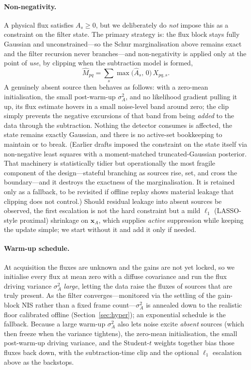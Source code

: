 \documentclass[11pt]{article}
\begin{document}
\paragraph{Non-negativity.} A physical flux satisfies $A_s\ge0$, but we deliberately do \emph{not}
impose this as a constraint on the filter state. The primary strategy is: the flux block stays
fully Gaussian and unconstrained---so the Schur marginalisation above remains exact and the filter
recursion never branches---and non-negativity is applied only at the point of \emph{use}, by
clipping when the subtraction model is formed,
\begin{equation}
  \hat M_{pq}=\sum_s \max\!\big(\hat A_s,\,0\big)\,X_{pq,s}.
\end{equation}
A genuinely absent source then behaves as follows: with a zero-mean initialisation, the small
post-warm-up $\sigma_A^2$, and no likelihood gradient pulling it up, its flux estimate hovers in a
small noise-level band around zero; the clip simply prevents the negative excursions of that band
from being \emph{added} to the data through the subtraction. Nothing the detector consumes is
affected, the state remains exactly Gaussian, and there is no active-set bookkeeping to maintain or
to break. (Earlier drafts imposed the constraint on the state itself via non-negative least squares
with a moment-matched truncated-Gaussian posterior. That machinery is statistically tidier but
operationally the most fragile component of the design---stateful branching as sources rise, set,
and cross the boundary---and it destroys the exactness of the marginalisation. It is retained only
as a fallback, to be revisited if offline replay shows material leakage that clipping does not
control.) Should residual leakage into absent sources be observed, the first escalation is not the
hard constraint but a mild $\ell_1$ (LASSO-style proximal) shrinkage on $\bm{x}_A$, which supplies
\emph{active} suppression while keeping the update simple; we start without it and add it only if
needed.

\paragraph{Warm-up schedule.} At acquisition the fluxes are unknown and the gains are not yet
locked, so we initialise every flux at mean zero with a diffuse covariance and run the flux driving
variance $\sigma_A^2$ \emph{large}, letting the data raise the fluxes of sources that are truly
present. As the filter converges---monitored via the settling of the gain-block NIS rather than a
fixed frame count---$\sigma_A^2$ is annealed down to the realistic floor calibrated offline
(Section~\ref{sec:hyper}); an exponential schedule is the fallback. Because a large warm-up
$\sigma_A^2$ also lets noise excite \emph{absent} sources (which then freeze when the variance
tightens), the zero-mean initialisation, the small post-warm-up driving variance, and the
Student-$t$ weights together bias those fluxes back down, with the subtraction-time clip and the
optional $\ell_1$ escalation above as the backstops.
\end{document}
